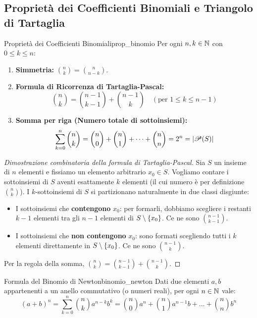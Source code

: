\subsection{Proprietà dei Coefficienti Binomiali e Triangolo di Tartaglia}

\begin{teorema}{Proprietà dei Coefficienti Binomiali}{prop_binomio}
Per ogni $n, k \in \N$ con $0 \le k \le n$:
\begin{enumerate}
    \item \textbf{Simmetria:} $\binom{n}{k} = \binom{n}{n-k}$.
    \item \textbf{Formula di Ricorrenza di Tartaglia-Pascal:}
    \[
        \binom{n}{k} = \binom{n-1}{k-1} + \binom{n-1}{k} \quad (\text{per } 1 \le k \le n-1)
    \]
    \item \textbf{Somma per riga (Numero totale di sottoinsiemi):}
    \[
        \sum_{k=0}^n \binom{n}{k} = \binom{n}{0} + \binom{n}{1} + \dots + \binom{n}{n} = 2^n = |\P(S)|
    \]
\end{enumerate}
\end{teorema}

\begin{proof}[Dimostrazione combinatoria della formula di Tartaglia-Pascal]
Sia $S$ un insieme di $n$ elementi e fissiamo un elemento arbitrario $x_0 \in S$. Vogliamo contare i sottoinsiemi di $S$ aventi esattamente $k$ elementi (il cui numero è per definizione $\binom{n}{k}$).
I $k$-sottoinsiemi di $S$ si partizionano naturalmente in due classi disgiunte:
\begin{itemize}
    \item I sottoinsiemi che \textbf{contengono} $x_0$: per formarli, dobbiamo scegliere i restanti $k-1$ elementi tra gli $n-1$ elementi di $S \smin \{x_0\}$. Ce ne sono $\binom{n-1}{k-1}$.
    \item I sottoinsiemi che \textbf{non contengono} $x_0$: sono formati scegliendo tutti i $k$ elementi direttamente in $S \smin \{x_0\}$. Ce ne sono $\binom{n-1}{k}$.
\end{itemize}
Per la regola della somma, $\binom{n}{k} = \binom{n-1}{k-1} + \binom{n-1}{k}$.
\end{proof}

\begin{teorema}{Formula del Binomio di Newton}{binomio_newton}
Dati due elementi $a, b$ appartenenti a un anello commutativo (o numeri reali), per ogni $n \in \N$ vale:
\[
    (a + b)^n = \sum_{k=0}^n \binom{n}{k} a^{n-k} b^k = \binom{n}{0}a^n + \binom{n}{1}a^{n-1}b + \dots + \binom{n}{n}b^n
\]
\end{teorema}

